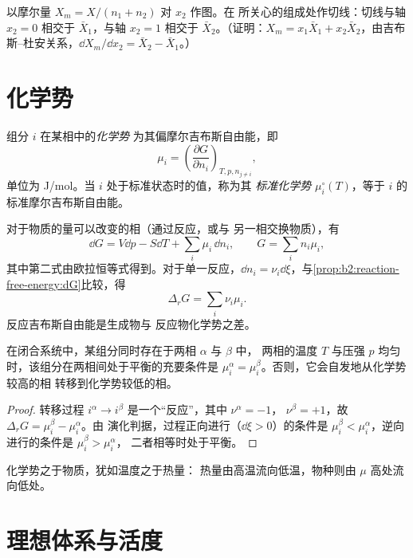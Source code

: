 \begin{method}[由曲线求偏摩尔量]\label{met:b2:chemical-potential:tangent}
以摩尔量 $X_m = X/(n_1 + n_2)$ 对 $x_2$ 作图。在
所关心的组成处作切线：切线与轴 $x_2 = 0$ 相交于
$\bar X_1$，与轴 $x_2 = 1$ 相交于 $\bar X_2$。（证明：$X_m = x_1\bar X_1 +
x_2\bar X_2$，由吉布斯–杜安关系，$\dd X_m/\dd x_2 = \bar X_2 - \bar X_1$。）
\end{method}

\section{化学势}

\begin{definition}[化学势]\label{def:b2:chemical-potential:chemical-potential}
组分 $i$ 在某相中的\emph{化学势}
为其偏摩尔吉布斯自由能，即
\[
  \mu_i = \left(\frac{\partial G}{\partial n_i}\right)_{T, p, n_{j\ne i}} ,
\]
单位为 \unit{J/mol}。当 $i$ 处于标准状态时的值，称为其
\emph{标准化学势}
$\mu_i^\circ(T)$，等于 $i$ 的标准摩尔吉布斯自由能。
\end{definition}

对于物质的量可以改变的相（通过反应，或与
另一相交换物质），有
\[
  \dd G = V\dd p - S\dd T + \sum_i\mu_i\,\dd n_i ,\qquad G = \sum_i n_i\mu_i ,
\]
其中第二式由欧拉恒等式得到。对于单一反应，$\dd n_i =
\nu_i\dd\xi$，与\cref{prop:b2:reaction-free-energy:dG}比较，得
\[
  \Delta_r G = \sum_i\nu_i\mu_i .
\]
反应吉布斯自由能是生成物与
反应物化学势之差。

\begin{theorem}[相间平衡]\label{thm:b2:chemical-potential:phase-equilibrium}
在闭合系统中，某组分同时存在于两相 $\alpha$ 与 $\beta$ 中，
两相的温度 $T$ 与压强 $p$ 均匀时，该组分在两相间处于平衡的充要条件是
$\mu_i^\alpha = \mu_i^\beta$。否则，它会自发地从化学势较高的相
转移到化学势较低的相。
\end{theorem}

\begin{proof}
转移过程 $i^\alpha \to i^\beta$ 是一个“反应”，其中 $\nu^\alpha = -1$，
$\nu^\beta = +1$，故 $\Delta_r G = \mu_i^\beta - \mu_i^\alpha$。由
演化判据，过程正向进行（$\dd\xi > 0$）的条件是 $\mu_i^\beta <
\mu_i^\alpha$，逆向进行的条件是 $\mu_i^\beta > \mu_i^\alpha$，
二者相等时处于平衡。
\end{proof}

化学势之于物质，犹如温度之于热量：
热量由高温流向低温，物种则由 $\mu$ 高处流向低处。

\section{理想体系与活度}

